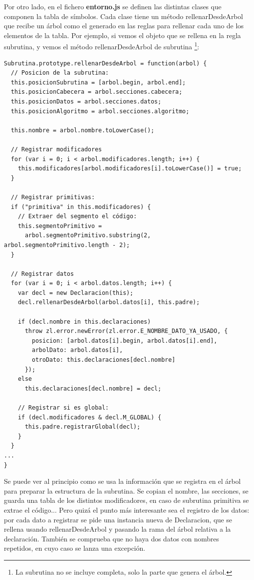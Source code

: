 \documentclass{report}
\begin{document}
	Por otro lado, en el fichero \textbf{entorno.js} se definen las distintas clases que componen la tabla de símbolos. Cada clase tiene un método rellenarDesdeArbol que recibe un árbol como el generado en las reglas para rellenar cada uno de los elementos de la tabla. Por ejemplo, si vemos el objeto que se rellena en la regla subrutina, y vemos el método rellenarDesdeArbol de subrutina \footnote{La subrutina no se incluye completa, solo la parte que genera el árbol.}:
	\begin{BVerbatim}
Subrutina.prototype.rellenarDesdeArbol = function(arbol) {
  // Posicion de la subrutina:
  this.posicionSubrutina = [arbol.begin, arbol.end];
  this.posicionCabecera = arbol.secciones.cabecera;
  this.posicionDatos = arbol.secciones.datos;
  this.posicionAlgoritmo = arbol.secciones.algoritmo;

  this.nombre = arbol.nombre.toLowerCase();

  // Registrar modificadores
  for (var i = 0; i < arbol.modificadores.length; i++) {
    this.modificadores[arbol.modificadores[i].toLowerCase()] = true;
  }

  // Registrar primitivas:
  if ("primitiva" in this.modificadores) {
    // Extraer del segmento el código:
    this.segmentoPrimitivo = 
      arbol.segmentoPrimitivo.substring(2, arbol.segmentoPrimitivo.length - 2);
  }

  // Registrar datos
  for (var i = 0; i < arbol.datos.length; i++) {
    var decl = new Declaracion(this);
    decl.rellenarDesdeArbol(arbol.datos[i], this.padre);

    if (decl.nombre in this.declaraciones)
      throw zl.error.newError(zl.error.E_NOMBRE_DATO_YA_USADO, {
        posicion: [arbol.datos[i].begin, arbol.datos[i].end],
        arbolDato: arbol.datos[i],
        otroDato: this.declaraciones[decl.nombre]
      });
    else
      this.declaraciones[decl.nombre] = decl;

    // Registrar si es global:
    if (decl.modificadores & decl.M_GLOBAL) {
      this.padre.registrarGlobal(decl);
    }
  }
...
}
	\end{BVerbatim}
	
	Se puede ver al principio como se usa la información que se registra en el árbol para preparar la estructura de la subrutina. Se copian el nombre, las secciones, se guarda una tabla de los distintos modificadores, en caso de subrutina primitiva se extrae el código... Pero quizá el punto más interesante sea el registro de los datos: por cada dato a registrar se pide una instancia nueva de Declaracion, que se rellena usando rellenarDesdeArbol y pasando la rama del árbol relativa a la declaración. También se comprueba que no haya dos datos con nombres repetidos, en cuyo caso se lanza una excepción. 
	
\end{document}
